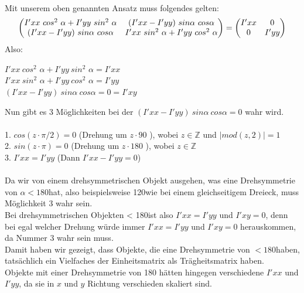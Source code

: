\documentclass{ezb}
\begin{document}
\linebreak
\\
Mit unserem oben genannten Ansatz muss folgendes gelten:\\
\begin{equation}
\begin{pmatrix}
I'xx \ cos^{2}$ $\alpha + I'yy \ sin^{2}$ $\alpha & (I'xx - I'yy) \ sin \alpha \ cos \alpha \\
(I'xx - I'yy) \ sin \alpha \ cos \alpha & I'xx \ sin^{2}$ $\alpha + I'yy \ cos^{2}$ $\alpha
\end{pmatrix}
=
\begin{pmatrix}
I'xx & 0 \\
0 & I'yy
\end{pmatrix}
\end{equation}
\newpage
Also:\\
\begin{center}
$I'xx \ cos^{2}$ $\alpha + I'yy \ sin^{2}$ $\alpha = I'xx$\\
$I'xx \ sin^{2}$ $\alpha + I'yy \ cos^{2}$ $\alpha = I'yy$\\
$ (I'xx - I'yy) \ sin \alpha \ cos \alpha =0 = I'xy $\\
\end{center}
Nun gibt es 3 Möglichkeiten bei der $ (I'xx - I'yy) \ sin \alpha \ cos \alpha =0 $ wahr wird.\\
\\
1. $cos(z \cdot \pi / 2) = 0$ (Drehung um $z \cdot 90$ \degree), wobei $z \in \mathbb{Z}$ und $|mod(z,2)| = 1$\\
2. $sin(z \cdot \pi) = 0$ (Drehung um $z \cdot 180$ \degree), wobei $z \in \mathbb{Z}$\\
3. $I'xx = I'yy$ (Dann $I'xx - I'yy = 0$)\\
\\
Da wir von einem drehsymmetrischen Objekt ausgehen, was eine Drehsymmetrie von $\alpha < 180$\degree hat, also beispielsweise 120\degree wie bei einem gleichseitigem Dreieck, muss Möglichkeit 3 wahr sein.\\
Bei drehsymmetrischen Objekten < 180\degree ist also $I'xx = I'yy$ und $I'xy = 0$, denn bei egal welcher Drehung würde immer  $I'xx = I'yy$ und $I'xy = 0$ herauskommen, da Nummer 3 wahr sein muss.\\
Damit haben wir gezeigt, dass Objekte, die eine Drehsymmetrie von $< 180$\degree haben, tatsächlich ein Vielfaches der Einheitsmatrix als Trägheitsmatrix haben.\\
Objekte mit einer Drehsymmetrie von 180 hätten hingegen verschiedene $I'xx$ und $I'yy$, da sie in $x$ und $y$ Richtung verschieden skaliert sind.\\
\end{document}
